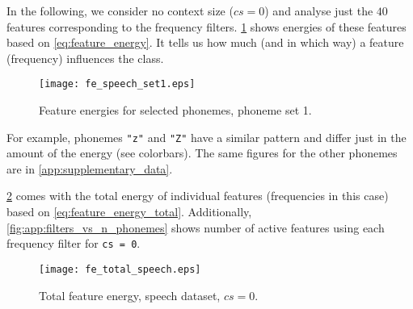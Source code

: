 In the following, we consider no context size ($ cs = 0 $) and analyse just the $ 40 $ features corresponding to the frequency filters. \cref{fig:examples:speech_fe_set1} shows energies of these features based on \cref{eq:feature_energy}. It tells us how much (and in which way) a feature (frequency) influences the class.

\begin{figure}[H]
\centering
\texttt{[image: fe\_speech\_set1.eps]}
\caption{Feature energies for selected phonemes, phoneme set 1.}
\label{fig:examples:speech_fe_set1}
\end{figure}

For example, phonemes \texttt{"z"} and \texttt{"Z"} have a similar pattern and differ just in the amount of the energy (see colorbars). The same figures for the other phonemes are in \cref{app:supplementary_data}.

\cref{fig:examples:speech_fe_total} comes with the total energy of individual features (frequencies in this case) based on \cref{eq:feature_energy_total}. Additionally, \cref{fig:app:filters_vs_n_phonemes} shows number of active features using each frequency filter for \texttt{cs = 0}.
\begin{figure}[H]
\centering
\texttt{[image: fe\_total\_speech.eps]}
\caption{Total feature energy, speech dataset, $ cs = 0 $.}
\label{fig:examples:speech_fe_total}
\end{figure}